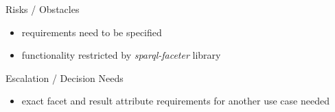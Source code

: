 \documentclass[]{kiesgrube}
\begin{document}
\begin{poster}
\begin{posterbox}[name=risks,column=1,below=open]{Risks / Obstacles}
\begin{itemize}
\item requirements need to be specified
\item functionality restricted by \emph{sparql-faceter} library
\end{itemize}
\end{posterbox}
\begin{posterbox}[name=escalation,column=1,below=risks]{Escalation / Decision Needs}
\begin{itemize}
\item exact facet and result attribute requirements for another use case needed 
\end{itemize}
\end{posterbox}


\end{poster}
\end{document}
